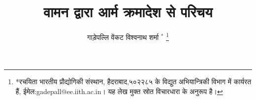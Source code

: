 \documentclass[journal,12pt,twocolumn]{IEEEtran}
\renewcommand\thesection{\arabic{section}}
\begin{document}
\let\StandardTheFigure\thefigure
\let\vec\mathbf
\renewcommand{\thefigure}{\thesection}



\def\putbox#1#2#3{\makebox[0in][l]{\makebox[#1][l]{}\raisebox{\baselineskip}[0in][0in]{\raisebox{#2}[0in][0in]{#3}}}}
     \def\rightbox#1{\makebox[0in][r]{#1}}
     \def\centbox#1{\makebox[0in]{#1}}
     \def\topbox#1{\raisebox{-\baselineskip}[0in][0in]{#1}}
     \def\midbox#1{\raisebox{-0.5\baselineskip}[0in][0in]{#1}}

\vspace{3cm}

\title{
वामन द्वारा आर्म क्रमादेश से परिचय
}
\author{ गाड़ेपल्लि वेंकट विश्वनाथ शर्मा $^{*}$%
	\thanks{*रचयिता भारतीय प्रौद्योगिकी संस्थान, हैदराबाद,५०२२८५ के विद्युत अभियान्त्रिकी विभाग में कार्यरत हैं, ईमेल:gadepall@ee.iith.ac.in। यह लेख मुक्त स्रोत विचारधारा के अनुरूप  है।}
	
}	


%
%
%

% 
%
\end{document}
